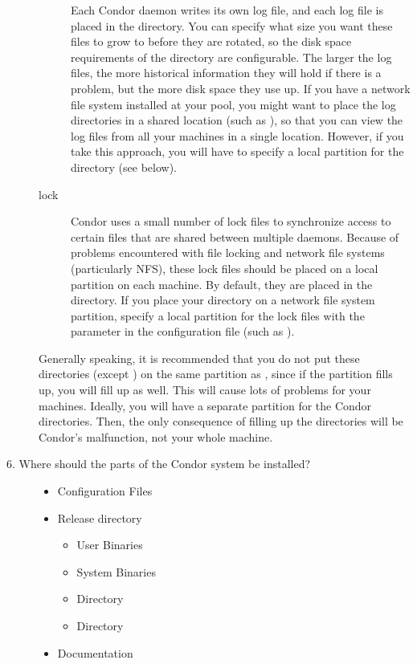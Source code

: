 \begin{description}
\begin{description}
\item[\File{log}] Each Condor daemon writes its own log file,
and each log file is placed
in the  directory.  You can specify what size you want these files
to grow to before they are rotated,
%
%
so the disk space requirements of
the directory are configurable.
The larger the log files, the more
historical information they will hold if there is a problem, but the
more disk space they use up.  If you have a network file system
installed at your pool, you might want to place the log directories in
a shared location (such as ),
so that you can view the log files from all your machines in a single
location.  However, if you take this approach, you will have to
specify a local partition for the  directory (see below).

\item[lock] Condor uses a small number of lock files to synchronize
access to certain files that are shared between multiple daemons.
Because of problems encountered with file locking and network
file systems (particularly NFS), these lock files should be placed on a
local partition on each machine.  By default, they are placed in
the  directory.  If you place your 
directory on a network file system partition,
specify a local partition for the
lock files with the  parameter in the configuration file (such as
).

\end{description}

Generally speaking, it is recommended that you do not put these directories
(except ) on the same partition as ,
since if the partition
fills up, you will fill up  as well. 
This will cause lots of
problems for your machines.  Ideally, you will have a separate partition
for the Condor directories. Then, the only consequence of filling up
the directories
will be Condor's malfunction, not your whole machine.

\item[6. Where should the parts of the Condor system be installed?]

	\begin{itemize}
	\item Configuration Files
	\item Release directory
		\begin{itemize}
		\item User Binaries
		\item System Binaries 
		\item {} Directory
	  	\item {} Directory
		\end{itemize}
	\item Documentation
	\end{itemize}


\end{description}
